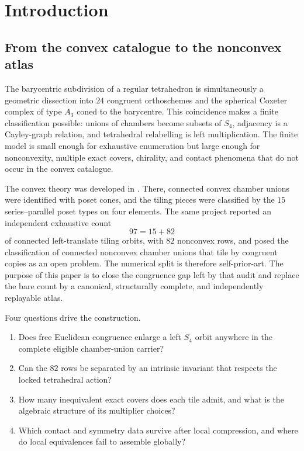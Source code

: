 \section{Introduction}\label{sec:introduction}

\subsection{From the convex catalogue to the nonconvex atlas}

The barycentric subdivision of a regular tetrahedron is simultaneously a
geometric dissection into $24$ congruent orthoschemes and the spherical
Coxeter complex of type $A_3$ coned to the barycentre.  This coincidence
makes a finite classification possible: unions of chambers become subsets of
$S_4$, adjacency is a Cayley-graph relation, and tetrahedral relabelling is
left multiplication.  The finite model is small enough for exhaustive
enumeration but large enough for nonconvexity, multiple exact covers,
chirality, and contact phenomena that do not occur in the convex catalogue.

The convex theory was developed in \cite{BabanskyyT2}.  There, connected
convex chamber unions were identified with poset cones, and the tiling pieces
were classified by the $15$ series--parallel poset types on four elements.
The same project reported an independent exhaustive count
\[
  97=15+82
\]
of connected left-translate tiling orbits, with $82$ nonconvex rows, and
posed the classification of connected nonconvex chamber unions that tile by
congruent copies as an open problem.  The numerical split is therefore
self-prior-art.  The purpose of this paper is to close the congruence gap
left by that audit and replace the bare count by a canonical, structurally
complete, and independently replayable atlas.

Four questions drive the construction.
\begin{enumerate}[label=(\roman*),leftmargin=2.2em]
\item Does free Euclidean congruence enlarge a left $S_4$ orbit anywhere in
the complete eligible chamber-union carrier?
\item Can the $82$ rows be separated by an intrinsic invariant that respects
the locked tetrahedral action?
\item How many inequivalent exact covers does each tile admit, and what is the
algebraic structure of its multiplier choices?
\item Which contact and symmetry data survive after local compression, and
where do local equivalences fail to assemble globally?
\end{enumerate}


